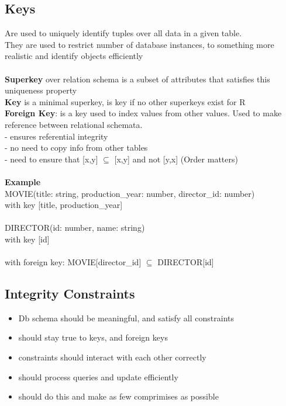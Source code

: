 \documentclass{article}
\newcommand\tab[1][0.5cm]{\hspace*{#1}}
\begin{document}
	\subsection{Keys}
		Are used to uniquely identify tuples over all data in a given table.
		\\ They are used to restrict number of database instances, to something more realistic and identify objects efficiently
		\\ \\ 
		\textbf{Superkey} over relation schema is a subset of attributes that satisfies this uniqueness property
		\\ \textbf{Key} is a minimal superkey, is key if no other superkeys exist for R
		\\ \textbf{Foreign Key}: is a key used to index values from other values. Used to make reference between relational schemata. 
		\\ \tab - ensures referential integrity
		\\ \tab - no need to copy info from other tables
		\\ \tab - need to ensure that [x,y] $\subseteq$ [x,y] and not [y,x] (Order matters)
		\\ \\ \textbf{Example}
		\\ MOVIE(title: string, production\_year: number, director\_id: number) 
		\\ with key [title, production\_year]
		\\ \\ DIRECTOR(id: number, name: string)
		\\ with key [id]
		\\ \\ with foreign key: MOVIE[director\_id] $\subseteq$ DIRECTOR[id]

	\subsection{Integrity Constraints}
		\begin{itemize}
			\item Db schema should be meaningful, and satisfy all constraints
			\item should stay true to keys, and foreign keys
			\item constraints should interact with each other correctly
			\item should process queries and update efficiently
			\item should do this and make as few comprimises as possible
		\end{itemize}
\end{document}
